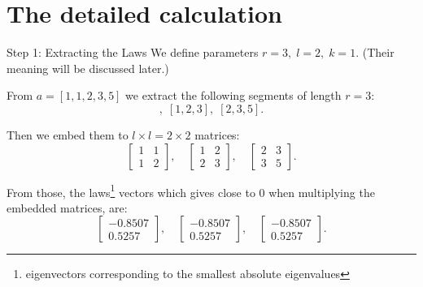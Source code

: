 \documentclass{beamer}
\begin{document}
\section{The detailed calculation}

\begin{frame}{Step 1: Extracting the Laws}
  We define parameters \( r = 3, \; l = 2, \; k = 1 \). {\color{gray}(Their meaning will be discussed later.)}

  From \( a = [1, 1, 2, 3, 5] \) we extract the following segments of length \( r = 3 \):
  \begin{equation}
    [1, 1, 2], \; [1, 2, 3], \; [2, 3, 5].
  \end{equation}

  Then we embed them to \( l \times l = 2 \times 2 \) matrices:
  \begin{equation}
    \begin{bmatrix} 1 & 1 \\ 1 & 2 \end{bmatrix}, \quad
    \begin{bmatrix} 1 & 2 \\ 2 & 3 \end{bmatrix}, \quad
    \begin{bmatrix} 2 & 3 \\ 3 & 5 \end{bmatrix}.
  \end{equation}

  From those, the laws\footnote{eigenvectors corresponding to the smallest absolute eigenvalues} vectors which gives close to 0 when multiplying the embedded matrices, are:
  \begin{equation}
    \begin{bmatrix} -0.8507 \\ 0.5257 \end{bmatrix}, \quad
    \begin{bmatrix} -0.8507 \\ 0.5257 \end{bmatrix}, \quad
    \begin{bmatrix} -0.8507 \\ 0.5257 \end{bmatrix}.
  \end{equation}
\end{frame}
\end{document}
